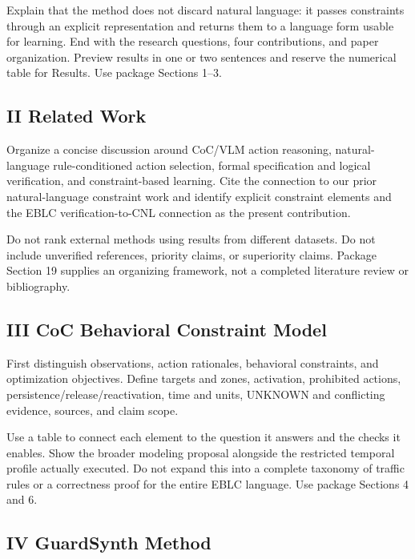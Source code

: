 \documentclass[11pt,a4paper]{article}
\begin{document}
Explain that the method does not discard natural language: it passes constraints through an explicit representation and returns them to a language form usable for learning. End with the research questions, four contributions, and paper organization. Preview results in one or two sentences and reserve the numerical table for Results. Use package Sections 1–3.\par

\subsection*{II Related Work}

Organize a concise discussion around CoC/VLM action reasoning, natural-language rule-conditioned action selection, formal specification and logical verification, and constraint-based learning. Cite the connection to our prior natural-language constraint work and identify explicit constraint elements and the EBLC verification-to-CNL connection as the present contribution.\par

Do not rank external methods using results from different datasets. Do not include unverified references, priority claims, or superiority claims. Package Section 19 supplies an organizing framework, not a completed literature review or bibliography.\par

\subsection*{III CoC Behavioral Constraint Model}

First distinguish observations, action rationales, behavioral constraints, and optimization objectives. Define targets and zones, activation, prohibited actions, persistence/release/reactivation, time and units, UNKNOWN and conflicting evidence, sources, and claim scope.\par

Use a table to connect each element to the question it answers and the checks it enables. Show the broader modeling proposal alongside the restricted temporal profile actually executed. Do not expand this into a complete taxonomy of traffic rules or a correctness proof for the entire EBLC language. Use package Sections 4 and 6.\par

\subsection*{IV GuardSynth Method}
\end{document}
